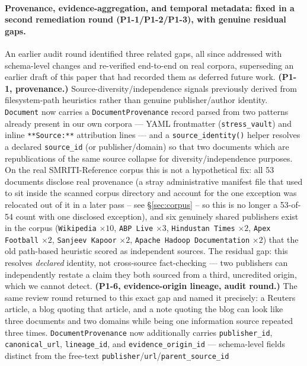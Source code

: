 \paragraph{Provenance, evidence-aggregation, and temporal metadata: fixed
in a second remediation round (P1-1/P1-2/P1-3), with genuine residual
gaps.} An earlier audit round identified three related gaps,
all since addressed with schema-level changes and re-verified end-to-end
on real corpora, superseding an earlier draft of this paper that had
recorded them as deferred future work. \textbf{(P1-1, provenance.)}
Source-diversity/independence signals previously derived from
filesystem-path heuristics rather than genuine publisher/author identity.
\texttt{Document} now carries a \texttt{DocumentProvenance} record parsed
from two patterns already present in our own corpora --- YAML frontmatter
(\texttt{stress\_vault}) and inline \texttt{**Source:**} attribution lines
--- and a \texttt{source\_identity()} helper resolves a declared
\texttt{source\_id} (or publisher/domain) so that two documents which are
republications of the same source collapse for diversity/independence
purposes. On the real SMRITI-Reference corpus this is not a hypothetical
fix: all 53 documents disclose real provenance (a stray
administrative manifest file that used to sit inside the scanned corpus
directory and account for the one exception was relocated out of it in
a later pass -- see \S\ref{sec:corpus} -- so this is no longer a
53-of-54 count with one disclosed exception), and six genuinely
shared publishers exist in the corpus (\texttt{Wikipedia} $\times 10$,
\texttt{ABP Live} $\times 3$, \texttt{Hindustan Times} $\times 2$,
\texttt{Apex Football} $\times 2$, \texttt{Sanjeev Kapoor} $\times 2$,
\texttt{Apache Hadoop Documentation} $\times 2$) that the old path-based
heuristic scored as independent sources. The residual gap: this resolves
\emph{declared} identity, not cross-source fact-checking --- two
publishers can independently restate a claim they both sourced from a
third, uncredited origin, which we cannot detect. \textbf{(P1-6, evidence-origin
lineage, audit round.)} The same review round returned to this exact gap
and named it precisely: a Reuters article, a blog quoting that article,
and a note quoting the blog can look like three documents and two
domains while being one information source repeated three times.
\texttt{DocumentProvenance} now additionally carries
\texttt{publisher\_id}, \texttt{canonical\_url}, \texttt{lineage\_id}, and
\texttt{evidence\_origin\_id} --- schema-level fields distinct from the
free-text \texttt{publisher}/\texttt{url}/\texttt{parent\_source\_id}
